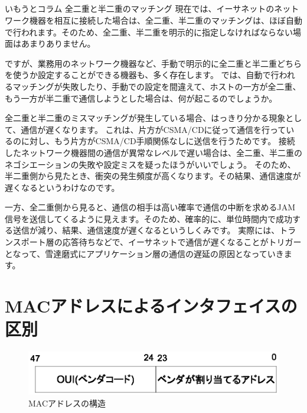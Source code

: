 \subsection*{}
\begin{itembox}[l]{いもうとコラム 全二重と半二重のマッチング}
現在では、イーサネットのネットワーク機器を相互に接続した場合は、全二重、半二重のマッチングは、ほぼ自動で行われます。そのため、全二重、半二重を明示的に指定しなければならない場面はあまりありません。

ですが、業務用のネットワーク機器など、手動で明示的に全二重と半二重どちらを使うか設定することができる機器も、多く存在します。
では、自動で行われるマッチングが失敗したり、手動での設定を間違えて、ホストの一方が全二重、もう一方が半二重で通信しようとした場合は、何が起こるのでしょうか。

全二重と半二重のミスマッチングが発生している場合、はっきり分かる現象として、通信が遅くなります。
これは、片方がCSMA/CDに従って通信を行っているのに対し、もう片方がCSMA/CD手順関係なしに送信を行うためです。
接続したネットワーク機器間の通信が異常なレベルで遅い場合は、全二重、半二重のネゴシエーションの失敗や設定ミスを疑ったほうがいいでしょう。
そのため、半二重側から見たとき、衝突の発生頻度が高くなります。その結果、通信速度が遅くなるというわけなのです。

一方、全二重側から見ると、通信の相手は高い確率で通信の中断を求めるJAM信号を送信してくるように見えます。そのため、確率的に、単位時間内で成功する送信が減り、結果、通信速度が遅くなるというしくみです。
実際には、トランスポート層の応答待ちなどで、イーサネットで通信が遅くなることがトリガーとなって、雪達磨式にアプリケーション層の通信の遅延の原因となっていきます。
\end{itembox}





\section{MACアドレスによるインタフェイスの区別}

\begin{figure}[htbp]
	\includegraphics[width=12cm,clip]{draw/macaddr.eps}
	\caption{MACアドレスの構造}
	\label{fig:macaddress}
\end{figure}

